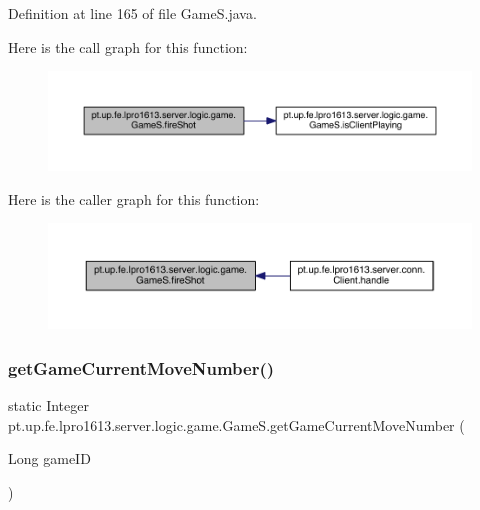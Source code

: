 Definition at line 165 of file Game\+S.\+java.

Here is the call graph for this function\+:
\nopagebreak
\begin{figure}[H]
\begin{center}
\leavevmode
\includegraphics[width=350pt]{classpt_1_1up_1_1fe_1_1lpro1613_1_1server_1_1logic_1_1game_1_1_game_s_a13d63cfefe7a487a5c6e694bbeba57e6_cgraph}
\end{center}
\end{figure}
Here is the caller graph for this function\+:
\nopagebreak
\begin{figure}[H]
\begin{center}
\leavevmode
\includegraphics[width=350pt]{classpt_1_1up_1_1fe_1_1lpro1613_1_1server_1_1logic_1_1game_1_1_game_s_a13d63cfefe7a487a5c6e694bbeba57e6_icgraph}
\end{center}
\end{figure}
\hypertarget{classpt_1_1up_1_1fe_1_1lpro1613_1_1server_1_1logic_1_1game_1_1_game_s_af9eabf8847fec79f112b49212847a478}{}\label{classpt_1_1up_1_1fe_1_1lpro1613_1_1server_1_1logic_1_1game_1_1_game_s_af9eabf8847fec79f112b49212847a478} 
\subsubsection{\texorpdfstring{get\+Game\+Current\+Move\+Number()}{getGameCurrentMoveNumber()}}
{\footnotesize\ttfamily static Integer pt.\+up.\+fe.\+lpro1613.\+server.\+logic.\+game.\+Game\+S.\+get\+Game\+Current\+Move\+Number (\begin{DoxyParamCaption}\item[{Long}]{game\+ID }\end{DoxyParamCaption})\hspace{0.3cm}{\ttfamily [static]}}

